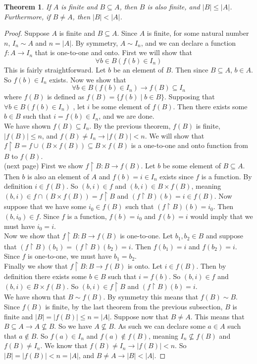 \documentclass{report}
\newtheorem*{theorem}{Theorem}
\theoremstyle{definition}
\begin{document}
\begin{theorem}
If $A$ is finite and $B\subseteq A$, then $B$ is also finite, and $|B|\leq|A|$. Furthermore, if $B\neq A$, then
$|B|<|A|$.
\end{theorem}
\begin{proof}
Suppose $A$ is finite and $B\subseteq A$. Since $A$ is finite, for some natural number $n$, $I_n\sim A$ and $n=|A|$.
By symmetry, $A\sim I_n$, and we can declare a function $f:A\to I_n$ that is one-to-one and onto.
First we will show that
\begin{equation*}
\forall b\in B(f(b)\in I_n)
\end{equation*}
This is fairly straightforward. Let $b$ be an element of $B$. Then since $B\subseteq A$, $b\in A$. 
So $f(b)\in I_n$ exists. Now we show that
\begin{equation*}
\forall b\in B(f(b)\in I_n)\rightarrow f(B)\subseteq I_n
\end{equation*}
where $f(B)$ is defined as $f(B)=\{f(b)\mid b\in B\}$. Supposing that $\forall b\in B(f(b)\in I_n)$ ,
let $i$ be some element of $f(B)$. Then there exists some $b\in B$ such that $i=f(b)\in I_n$, and we are done.\\
\indent We have shown $f(B)\subseteq I_n$. By the previous theorem, $f(B)$ is finite, $|f(B)|\leq n$, and 
$f(B)\neq I_n\to|f(B)|<n$. We will show that 
$f\restriction B=f\cup(B\times f(B))\subseteq B\times f(B)$ is a one-to-one and onto function from $B$ to $f(B)$.\\
(next page)\newpage
First we show $f\restriction B:B\to f(B)$. Let $b$ be some element of $B\subseteq A$. Then $b$ is also an element of
$A$ and $f(b)=i\in I_n$ exists since $f$ is a function. By
definition $i\in f(B)$. So $(b,i)\in f$ and $(b,i)\in B\times f(B)$, meaning
$(b,i)\in f\cap(B\times f(B))=f\restriction B$ and $(f\restriction B)(b)=i\in f(B)$.
Now suppose that we have some $i_0\in f(B)$ such that $(f\restriction B)(b)=i_0$. Then $(b,i_0)\in f$. Since 
$f$ is a function, $f(b)=i_0$ and $f(b)=i$ would imply that we must have $i_0=i$.\\
\indent Now we show that $f\restriction B:B\to f(B)$ is one-to-one. Let $b_1,b_2\in B$ and suppose that
$(f\restriction B)(b_1)=(f\restriction B)(b_2)=i$.
Then $f(b_1)=i$ and $f(b_2)=i$. Since $f$ is one-to-one, we must have $b_1=b_2$.\\
\indent Finally we show that $f\restriction B:B\to f(B)$ is onto. Let $i\in f(B)$. Then by definition there exists
some $b\in B$ such that $i=f(b)$. So $(b,i)\in f$ and 
$(b,i)\in B\times f(B)$. So $(b,i)\in f\restriction B$ and
$(f\restriction B)(b)=i$.\\
\indent We have shown that $B\sim f(B)$. By symmetry this means that $f(B)\sim B$. Since $f(B)$ is finite, by the 
last theorem from the previous subsection, $B$ is finite and $|B|=|f(B)|\leq n=|A|$. Suppose now that $B\neq A$. 
This means that $B\subseteq A\to A\nsubseteq B$. So we have $A\nsubseteq B$. As such we can declare some $a\in A$ 
such that $a\notin B$. So $f(a)\in I_n$ and $f(a)\notin f(B)$, meaning $I_n\nsubseteq f(B)$ and $f(B)\neq I_n$. We 
know that $f(B)\neq I_n\to|f(B)|<n$. So $|B|=|f(B)|<n=|A|$, and $B\neq A\to |B|<|A|$.
\end{proof}
\end{document}
